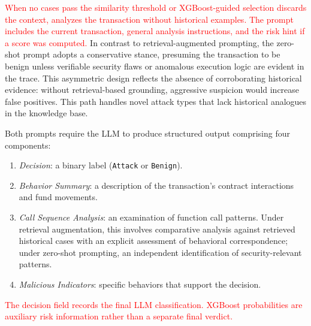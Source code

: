 
\textcolor{red}{When no cases pass the similarity threshold or XGBoost-guided selection discards the context, \approach{} analyzes the transaction without historical examples. The prompt includes the current transaction, general analysis instructions, and the risk hint if a score was computed.} In contrast to retrieval-augmented prompting, the zero-shot prompt adopts a conservative stance, presuming the transaction to be benign unless verifiable security flaws or anomalous execution logic are evident in the trace. This asymmetric design reflects the absence of corroborating historical evidence: without retrieval-based grounding, aggressive suspicion would increase false positives. This path handles novel attack types that lack historical analogues in the knowledge base.

Both prompts require the LLM to produce structured output comprising four components:
\begin{enumerate}
    \item \textit{Decision}: a binary label (\texttt{Attack} or \texttt{Benign}).
    \item \textit{Behavior Summary}: a description of the transaction's contract interactions and fund movements.
    \item \textit{Call Sequence Analysis}: an examination of function call patterns. Under retrieval augmentation, this involves comparative analysis against retrieved historical cases with an explicit assessment of behavioral correspondence; under zero-shot prompting, an independent identification of security-relevant patterns.
    \item \textit{Malicious Indicators}: specific behaviors that support the decision.
\end{enumerate}

\textcolor{red}{The decision field records the final LLM classification. XGBoost probabilities are auxiliary risk information rather than a separate final verdict.}


